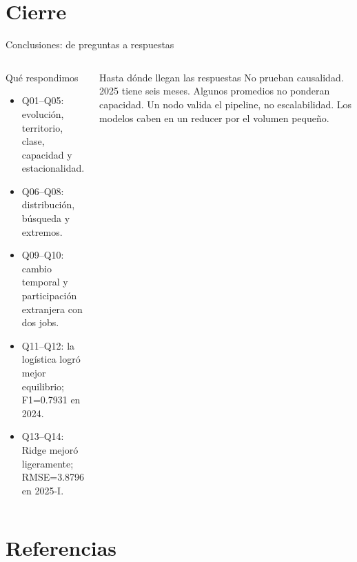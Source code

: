 \documentclass{beamer}
\begin{document}
\section{Cierre}

\begin{frame}{Conclusiones: de preguntas a respuestas}
\footnotesize
\begin{columns}[T,onlytextwidth]
\begin{block}{Qué respondimos}
\begin{itemize}
  \item Q01--Q05: evolución, territorio, clase, capacidad y estacionalidad.
  \item Q06--Q08: distribución, búsqueda y extremos.
  \item Q09--Q10: cambio temporal y participación extranjera con dos jobs.
  \item Q11--Q12: la logística logró mejor equilibrio; F1=0.7931 en 2024.
  \item Q13--Q14: Ridge mejoró ligeramente; RMSE=3.8796 en 2025-I.
\end{itemize}
\end{block}
\begin{alertblock}{Hasta dónde llegan las respuestas}
No prueban causalidad. 2025 tiene seis meses. Algunos promedios no ponderan capacidad. Un nodo valida el pipeline, no escalabilidad. Los modelos caben en un reducer por el volumen pequeño.
\end{alertblock}
\end{columns}
\end{frame}

\section{Referencias}
\end{document}
